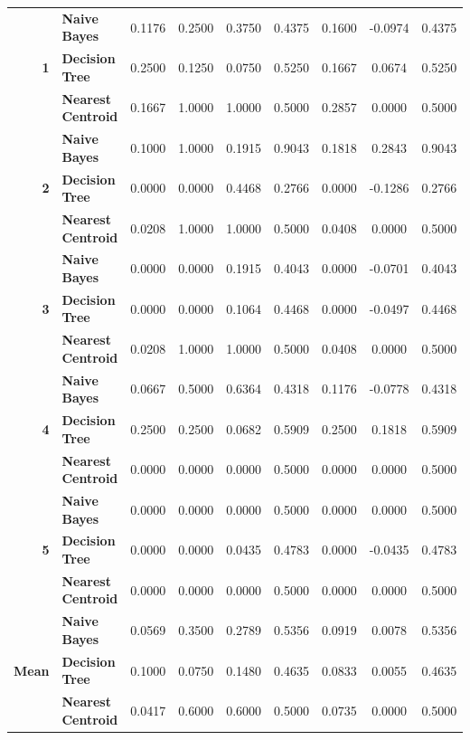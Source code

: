 \begin{center}
\begin{longtable}{ | r  l | c | c | c | c | c | c | c | }
\multirow{3}{*}{\textbf{1}} & \textbf{Naive Bayes} & 
0.1176 & 0.2500 & 0.3750 & 0.4375 & 0.1600 & -0.0974 & 0.4375 \\
& \textbf{Decision Tree} & 
0.2500 & 0.1250 & 0.0750 & 0.5250 & 0.1667 &  0.0674 & 0.5250 \\
& \textbf{Nearest Centroid} &
0.1667 & 1.0000 & 1.0000 & 0.5000 & 0.2857 &  0.0000 & 0.5000 \\
\hline
\multirow{3}{*}{\textbf{2}} & \textbf{Naive Bayes} & 
0.1000 & 1.0000 & 0.1915 & 0.9043 & 0.1818 &  0.2843 & 0.9043 \\
& \textbf{Decision Tree} & 
0.0000 & 0.0000 & 0.4468 & 0.2766 & 0.0000 & -0.1286 & 0.2766 \\
& \textbf{Nearest Centroid} &
0.0208 & 1.0000 & 1.0000 & 0.5000 & 0.0408 &  0.0000 & 0.5000 \\
\hline
\multirow{3}{*}{\textbf{3}} & \textbf{Naive Bayes} & 
0.0000 & 0.0000 & 0.1915 & 0.4043 & 0.0000 & -0.0701 & 0.4043 \\
& \textbf{Decision Tree} & 
0.0000 & 0.0000 & 0.1064 & 0.4468 & 0.0000 & -0.0497 & 0.4468 \\
& \textbf{Nearest Centroid} &
0.0208 & 1.0000 & 1.0000 & 0.5000 & 0.0408 &  0.0000 & 0.5000 \\
\hline
\multirow{3}{*}{\textbf{4}} & \textbf{Naive Bayes} & 
0.0667 & 0.5000 & 0.6364 & 0.4318 & 0.1176 & -0.0778 & 0.4318 \\
& \textbf{Decision Tree} & 
0.2500 & 0.2500 & 0.0682 & 0.5909 & 0.2500 &  0.1818 & 0.5909 \\
& \textbf{Nearest Centroid} &
0.0000 & 0.0000 & 0.0000 & 0.5000 & 0.0000 &  0.0000 & 0.5000 \\
\hline
\multirow{3}{*}{\textbf{5}} & \textbf{Naive Bayes} & 
0.0000 & 0.0000 & 0.0000 & 0.5000 & 0.0000 &  0.0000 & 0.5000 \\
& \textbf{Decision Tree} & 
0.0000 & 0.0000 & 0.0435 & 0.4783 & 0.0000 & -0.0435 & 0.4783 \\
& \textbf{Nearest Centroid} &
0.0000 & 0.0000 & 0.0000 & 0.5000 & 0.0000 &  0.0000 & 0.5000 \\
\hline
\multirow{3}{*}{\textbf{Mean}} & \textbf{Naive Bayes} & 
0.0569 & 0.3500 & 0.2789 & 0.5356 & 0.0919 &  0.0078 & 0.5356 \\
& \textbf{Decision Tree} & 
0.1000 & 0.0750 & 0.1480 & 0.4635 & 0.0833 &  0.0055 & 0.4635 \\
& \textbf{Nearest Centroid} &
0.0417 & 0.6000 & 0.6000 & 0.5000 & 0.0735 &  0.0000 & 0.5000 \\
\hline
\end{longtable}
\end{center}

